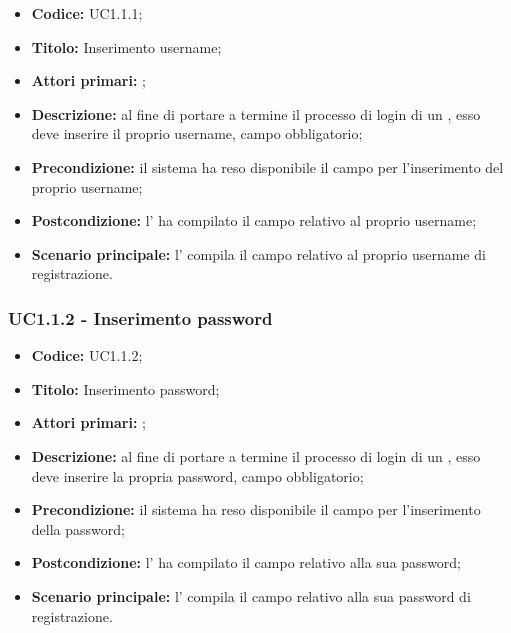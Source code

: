 \documentclass[casi-duso]{subfiles}
\begin{document}
\begin{itemize}
  \item \textbf{Codice:} UC1.1.1;
  \item \textbf{Titolo:} Inserimento username;
  \item \textbf{Attori primari:} ;
  \item \textbf{Descrizione:} al fine di portare a termine il processo di login di un , esso deve inserire il proprio username, campo obbligatorio;
  \item \textbf{Precondizione:} il sistema ha reso disponibile il campo per l'inserimento del proprio username;
  \item \textbf{Postcondizione:} l' ha compilato il campo relativo al proprio username;
  \item \textbf{Scenario principale:} l' compila il campo relativo al proprio username di registrazione.

\end{itemize}

\subsubsection{UC1.1.2 - Inserimento password}
\label{subsub:UC1.1.2}

\begin{itemize}
  \item \textbf{Codice:} UC1.1.2;
  \item \textbf{Titolo:} Inserimento password;
  \item \textbf{Attori primari:} ;
  \item \textbf{Descrizione:} al fine di portare a termine il processo di login di un , esso deve inserire la propria password, campo obbligatorio;
  \item \textbf{Precondizione:} il sistema ha reso disponibile il campo per l'inserimento della password;
  \item \textbf{Postcondizione:} l' ha compilato il campo relativo alla sua password;
  \item \textbf{Scenario principale:} l' compila il campo relativo alla sua password di registrazione.
  
\end{itemize}
\end{document}
